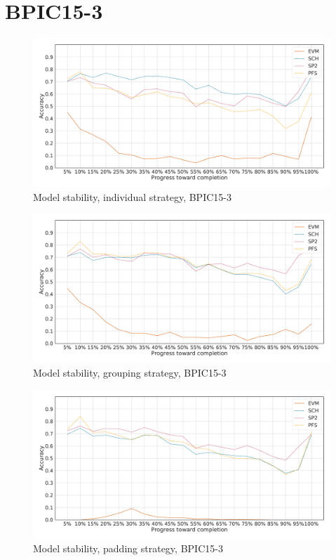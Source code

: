 \section*{BPIC15-3}
\begin{figure}[!htb]
    \centering
    \includegraphics[width=\textwidth]{gfx/bpic2015_3/individual_stability.pdf}
    \caption{Model stability, individual strategy, BPIC15-3}
    \label{fig:bpic15-3-individual-stability}
\end{figure}
\begin{figure}[!htb]
    \centering
    \includegraphics[width=\textwidth]{gfx/bpic2015_3/grouped_stability.pdf}
    \caption{Model stability, grouping strategy, BPIC15-3}
    \label{fig:bpic15-3-grouped-stability}
\end{figure}
\begin{figure}[!htb]
    \centering
    \includegraphics[width=\textwidth]{gfx/bpic2015_3/padded_stability.pdf}
    \caption{Model stability, padding strategy, BPIC15-3}
    \label{fig:bpic15-3-padded-stability}
\end{figure}
